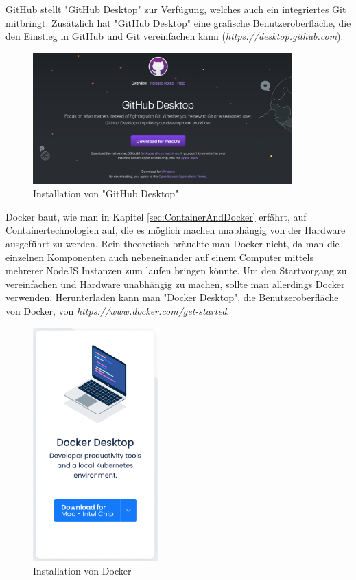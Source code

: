 GitHub stellt "GitHub Desktop" zur Verfügung, welches auch ein integriertes Git mitbringt. Zusätzlich hat "GitHub Desktop" eine grafische  Benutzeroberfläche, die den Einstieg in GitHub und Git vereinfachen kann (\emph{https://desktop.github.com}). 

\begin{figure}[H]
    \centering
    \includegraphics[width=100mm]{media/Handbuch/github_desktop.png}
    \caption{Installation von "GitHub Desktop"}
    \label{fig:githubdesktop}
\end{figure}


Docker baut, wie man in Kapitel \ref{sec:ContainerAndDocker} erfährt, auf Containertechnologien auf, die es möglich machen unabhängig von der Hardware ausgeführt zu werden. Rein theoretisch bräuchte man Docker nicht, da man die einzelnen Komponenten auch nebeneinander auf einem Computer mittels mehrerer NodeJS Instanzen zum laufen bringen könnte. Um den Startvorgang zu vereinfachen und Hardware unabhängig zu machen, sollte man allerdings Docker verwenden. Herunterladen kann man "Docker Desktop", die Benutzeroberfläche von Docker, von \emph{https://www.docker.com/get-started}.

\begin{figure}[H]
    \centering
    \includegraphics[height=90mm]{media/Handbuch/dockerdesktop.png}
    \caption{Installation von Docker}
\end{figure}

